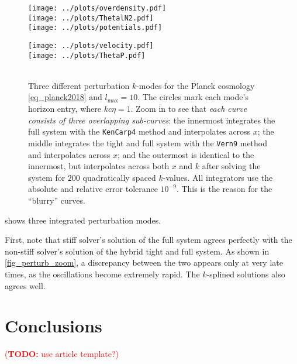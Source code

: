 \documentclass[10pt,a4paper]{article}
\newcommand\TODO[1]{\textcolor{red}{(\textbf{TODO:} #1)}}
\begin{document}
\begin{figure}[b]
\begin{minipage}{0.49\textwidth}
\texttt{[image: ../plots/overdensity.pdf]} \\
\texttt{[image: ../plots/ThetalN2.pdf]} \\
\texttt{[image: ../plots/potentials.pdf]} \\
\end{minipage}
\hfill
\begin{minipage}{0.49\textwidth}
\texttt{[image: ../plots/velocity.pdf]} \\
\texttt{[image: ../plots/ThetaP.pdf]} \\
 \\ %
\end{minipage}
\caption{%
	Three different perturbation $k$-modes for the Planck cosmology \eqref{eq_planck2018} and $l_\text{max}=10$.
	The circles mark each mode's horizon entry, where $k c \eta = 1$.
	Zoom in to see that \textit{each curve consists of three overlapping sub-curves}:
	the innermost integrates the full system with the \texttt{KenCarp4} method and interpolates across $x$;
	the middle integrates the tight and full system with the \texttt{Vern9} method and interpolates across $x$; and
	the outermost is identical to the innermost, but interpolates across both $x$ and $k$ after solving the system for $200$ quadratically spaced $k$-values.
	All integrators use the absolute and relative error tolerance $10^{-9}$.
	This is the reason for the ``blurry'' curves.
}
\label{fig_perturb_all}
\end{figure}%

 shows three integrated perturbation modes.

First, note that stiff solver's solution of the full system
agrees perfectly with the non-stiff solver's solution of the hybrid tight and full system.
As shown in \cref{fig_perturb_zoom}, a discrepancy between the two appears only at very late times, as the oscillations become extremely rapid.
The $k$-splined solutions also agrees well.

\clearpage
\section{Conclusions}

\TODO{use article template?}

%
\printbibliography
\end{document}
